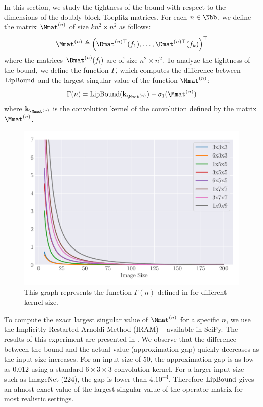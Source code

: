 In this section, we study the tightness of the bound with respect to the dimensions of the doubly-block Toeplitz matrices.
For each $n \in \Nbb$, we define the matrix  $\Mmat^{(n)}$ of size $kn^2 \times n^2$ as follows:
\begin{equation}
  \Mmat^{(n)} \triangleq \textstyle \leftmat \Dmat^{(n)\top}(f_1), \dots, \Dmat^{(n)\top}(f_k) \textstyle \rightmat^\top
\end{equation}
where the matrices $\Dmat^{(n)}(f_i)$ are of size $n^2 \times n^2$. 
To analyze the tightness of the bound, we define the function $\Gamma$, which computes the difference between $\mathrm{LipBound}$ and the largest singular value of the function $\Mmat^{(n)}$:
\begin{equation} \label{equation:function_convergence}
  \Gamma(n) = \lipbound(\mathbf{k}_{\Mmat^{(n)}}) - \sigma_1(\Mmat^{(n)})
\end{equation}
where $\mathbf{k}_{\Mmat^{(n)}}$ is the  convolution kernel of the convolution defined by the matrix $\Mmat^{(n)}$.

\begin{figure}[ht]
  \centering
  \includegraphics[width=\scalefigure\textwidth]{figures/main/ch5-lipschitz_regularization/convergence_bounds.pdf}
  \caption{This graph represents the function $\Gamma(n)$ defined in  for different kernel size.}
  \label{figure:convergence_bound}
\end{figure}


To compute the exact largest singular value of $\Mmat^{(n)}$ for a specific $n$, we use the Implicitly Restarted Arnoldi Method (IRAM) ~\cite{lehoucq1996deflation} available in SciPy.
The results of this experiment are presented in .
We observe that the difference between the bound and the actual value (approximation gap) quickly decreases as the input size increases.
For an input size of $50$, the approximation gap is as low as $0.012$ using a standard $6\times3\times3$ convolution kernel.
For a larger input size such as ImageNet ($224$), the gap is lower than $4.10^{-4}$.
Therefore $\mathrm{LipBound}$ gives an almost exact value of the largest singular value of the operator matrix for most realistic settings.

